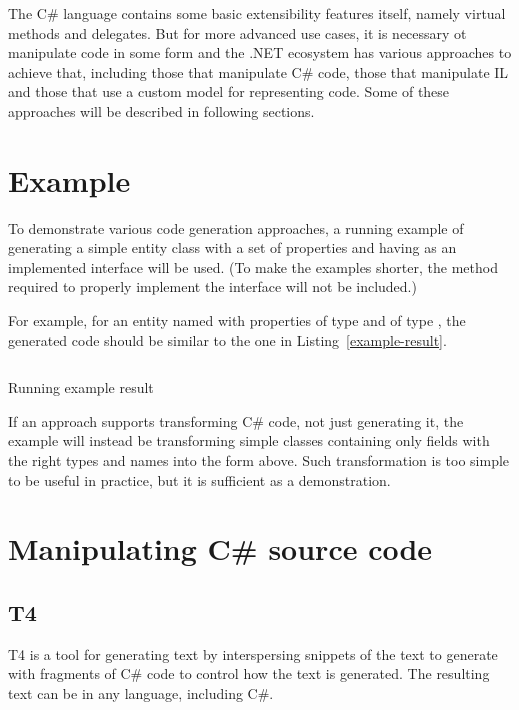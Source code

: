 \medskip

The C\# language contains some basic extensibility features itself, namely virtual methods and delegates.
But for more advanced use cases, it is necessary ot manipulate code in some form and the .NET ecosystem has various approaches to achieve that, including those that manipulate C\# code, those that manipulate \ac{IL} and those that use a custom model for representing code. Some of these approaches will be described in following sections.

\section{Example}

To demonstrate various code generation approaches, a running example of generating a simple entity class with a set of properties and having  as an implemented interface will be used. (To make the examples shorter, the  method required to properly implement the interface will not be included.)

For example, for an entity named  with properties  of type  and  of type , the generated code should be similar to the one in Listing~\ref{example-result}.

\begin{listing}
\inputminted{csharp}{samples/Core/Person.cs}
\caption{Running example result}
\label{example-result}
\end{listing}

If an approach supports transforming C\# code, not just generating it, the example will instead be transforming simple classes containing only fields with the right types and names into the form above. Such transformation is too simple to be useful in practice, but it is sufficient as a demonstration.

\section{Manipulating C\# source code}

\subsection{\acs{T4}}

\ac{T4} is a tool for generating text by interspersing snippets of the text to generate with fragments of C\# code to control how the text is generated. The resulting text can be in any language, including C\#.

